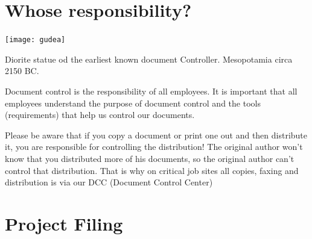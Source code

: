 \section*{Whose responsibility?}

\begin{marginfigure}
  \texttt{[image: gudea]}
  \caption{Diorite statue od the earliest known document Controller. Mesopotamia circa 2150 BC.}
  \label{fig:marginfig1}
\end{marginfigure}

Document control is the responsibility of all employees. It is important that all employees understand the purpose of document control and the tools (requirements) that help us control our documents.

Please be aware that if you copy a document or print one out and then distribute it, you are responsible for controlling the distribution! The original author won't know that you distributed more of his documents, so the original author can't control that distribution. That is why on critical job sites all copies, faxing and distribution is via our DCC (Document Control Center)






\section*{Project Filing}


